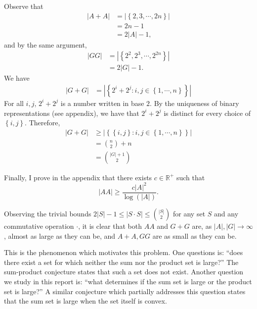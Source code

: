 \documentclass[12pt,reqno]{amsart}
\begin{document}
Observe that
\begin{align*}
    \left\lvert A + A \right\rvert  & = \left\lvert \left\{2,3, \cdots ,2n \right\}  \right\rvert \\
    & = 2n - 1 \\
    & = 2 \left\lvert A \right\rvert - 1,
\end{align*}
and by the same argument,
\begin{align*}
    \left\lvert GG \right\rvert  & = \left\lvert \left\{2^{2}, 2^{3}, \cdots , 2^{2n} \right\} \right\rvert  \\
    & =2 \left\lvert G \right\rvert -1.
\end{align*}
We have
\begin{align*}
    \left\lvert G + G \right\rvert & = \left\lvert \left\{ 2^{i} + 2^{j} : i,j \in \left\{ 1, \cdots , n \right\} \right\} \right\rvert
\end{align*}
For all \(i,j\), \(2^{i} + 2^{j}\) is a number written in base \(2\). By the uniqueness of binary representations
(see appendix), we have that \(2^{i} + 2^{j}\) is distinct for every choice of \(\left\{ i,j \right\} \). Therefore,
\begin{align*}
    \left\lvert G + G \right\rvert & \geq  \left\lvert \left\{ \left\{ i,j \right\} : i,j \in \left\{ 1, \cdots , n \right\}  \right\}  \right\rvert \\
    & = \binom{n}{2} + n \\
    & = \binom{\left\lvert G \right\rvert + 1}{2} 
\end{align*}

Finally, I prove in the appendix that there exists \(c \in \mathbb{R} ^{+}\) such that
\[
    \left\lvert AA \right\rvert \geq  \frac{c \left\lvert A \right\rvert ^{2}}{\log \left( \left\lvert A \right\rvert  \right) }
.\]

Observing the trivial bounds \( 2 \left\lvert S \right\rvert - 1 \leq \left\lvert S \cdot S \right\rvert \leq \binom{\left\lvert S \right\rvert }{2} \) for any set \(S\) and any
commutative operation \(\cdot \), it is clear that both \(AA\) and \(G +G\) are, as \(\left\lvert A \right\rvert, \left\lvert G \right\rvert \to \infty  \), almost as large as they can be,
and \(A + A, GG \) are as small as they can be.

This is the phenomenon which motivates this problem.
One questions is: ``does there exist a set for which neither the sum nor the product set is large?''
The sum-product conjecture states that such a set does not exist. 
Another question we study in this report is: ``what
determines if the sum set is large or the product set is large?'' A similar
conjecture which partially addresses this question states that the sum set is large
when the set itself is convex.
\end{document}
